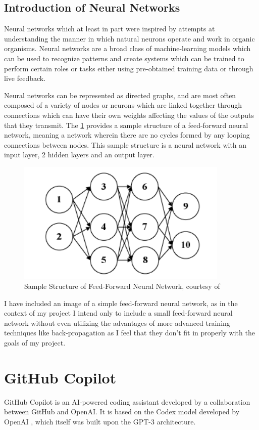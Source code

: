\subsection{Introduction of Neural Networks}
Neural networks which at least in part were inspired by attempts at understanding the manner in which natural neurons operate and work in organic organisms. Neural networks are a broad class of machine-learning models which can be used to recognize patterns and create systems which can be trained to perform certain roles or tasks either using pre-obtained training data or through live feedback.
\par
Neural networks can be represented as directed graphs, and are most often composed of a variety of nodes or neurons which are linked together through connections which can have their own weights affecting the values of the outputs that they transmit.
The \ref{image:neuralNetworkStructure} provides a sample structure of a feed-forward neural network, meaning a network wherein there are no cycles formed by any looping connections between nodes. This sample structure is a neural network with an input layer, 2 hidden layers and an output layer.
\begin{figure}[ht!]
    \includegraphics[width=0.9\textwidth]{images/NeuralNetworkStructure.png}
    \caption{Sample Structure of Feed-Forward Neural Network, courtesy of \cite{GURESEN2011426}}
    \label{image:neuralNetworkStructure}
\end{figure}
\par
I have included an image of a simple feed-forward neural network, as in the context of my project I intend only to include a small feed-forward neural network without even utilizing the advantages of more advanced training techniques like back-propagation as I feel that they don't fit in properly with the goals of my project.
\section{GitHub Copilot}
GitHub Copilot is an AI-powered coding assistant developed by a collaboration between GitHub and OpenAI. It is based on the Codex model developed by OpenAI \cite{OpenAICodex}, which itself was built upon the GPT-3 architecture. 
